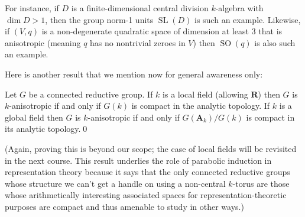\documentclass[10pt]{article}
\newcommand{\RR}{\mathbf{R}}
\renewcommand{\(}{\left(}
\renewcommand{\)}{\right)}
\numberwithin{thm}{subsection}
\begin{document}
For instance, if $D$ is a finite-dimensional central division $k$-algebra with $\dim D > 1$,
then the group norm-1 units $\operatorname{SL}(D)$ is such 
an example. Likewise, 
if $(V,q)$ is a non-degenerate quadratic space of dimension at least $3$ that is anisotropic 
(meaning $q$ has no nontrivial zeroes in $V$)
then $\operatorname{SO}(q)$ is also such an example.

Here is another result that we mention now for general awareness only: 

\begin{prop}\label{}
Let $G$ be a connected reductive group.
If $k$ is a local field (allowing $\RR$) then $G$ is $k$-anisotropic if and only if $G(k)$
is compact in the analytic topology.
If $k$ is a global field then $G$ is $k$-anisotropic if
and only if $G(\mathbf{A}_k)/G(k)$ is compact in its analytic topology.\qed
\end{prop}
(Again, proving this is beyond our scope; the case of local fields
will be revisited in the next course. This
result underlies the role of parabolic induction in representation theory
because it says that the only connected reductive groups whose structure we can't get a handle on using a non-central 
$k$-torus are 
those whose arithmetically interesting associated spaces for representation-theoretic purposes are compact and
thus amenable to study in other ways.)
\end{document}
